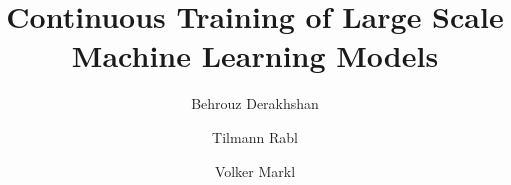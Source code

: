 \documentclass{vldb}
\begin{document}





%

\title{Continuous Training of Large Scale Machine Learning Models}

%
%
%
%
%


\renewcommand\Authfont{\fontsize{13}{14.4}\selectfont \bfseries }
\renewcommand\Affilfont{\fontsize{10}{14.4}\selectfont \normalfont}

\author[1]{Behrouz Derakhshan}
\author[1,2]{Tilmann Rabl}
\author[1,2]{Volker Markl}





\end{document}
